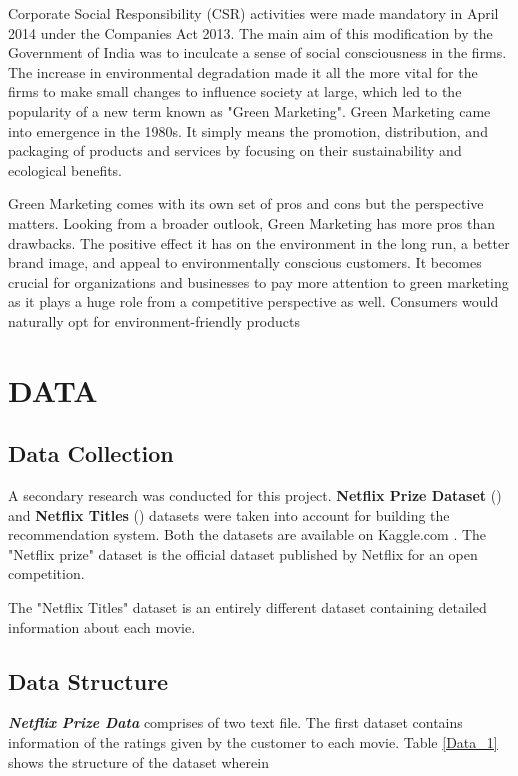 \documentclass[a4paper,10pt]{article}
\begin{document}
Corporate Social Responsibility (CSR) activities were made mandatory in April 2014 under the Companies Act 2013. The main aim of this modification by the Government of India was to inculcate a sense of social consciousness in the firms. The increase in environmental degradation made it all the more vital for the firms to make small changes to influence society at large, which led to the popularity of a new term known as "Green Marketing". Green Marketing came into emergence in the 1980s. It simply means the promotion, distribution, and packaging of products and services by focusing on their sustainability and ecological benefits. 

Green Marketing comes with its own set of pros and cons but the perspective matters. Looking from a broader outlook, Green Marketing has more pros than drawbacks. The positive effect it has on the environment in the long run, a better brand image, and appeal to environmentally conscious customers. It becomes crucial for organizations and businesses to pay more attention to green marketing as it plays a huge role from a competitive perspective as well. Consumers would naturally opt for environment-friendly products \cite{Groening2018}


\section{DATA}

\subsection{Data Collection}


A secondary research was conducted for this project.  \textbf{Netflix Prize Dataset} (\cite{netflix_prize_data})  and \textbf{Netflix Titles} (\cite{soeiro_n.d.}) datasets were taken into account for building the recommendation system. Both the datasets are available on Kaggle.com \cite{kaggle}. The "Netflix prize" dataset is the official dataset published by Netflix for an open competition. 

The "Netflix Titles" dataset is an entirely different dataset containing detailed information about each movie.

\subsection{Data Structure}

\textbf{\textit{Netflix Prize Data}} comprises of two text file. The first dataset contains information of the ratings given by the customer to each movie. Table \ref{Data_1} shows the structure of the dataset wherein 
\end{document}
